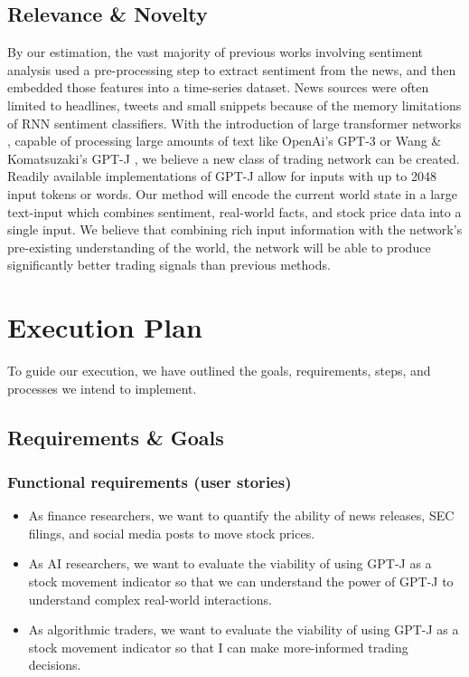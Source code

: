 \documentclass[conference]{IEEEtran}
\begin{document}
\subsection{Relevance \& Novelty}
By our estimation, the vast majority of previous works involving sentiment analysis used a pre-processing step to extract sentiment from the news, and then embedded those features into a time-series dataset. News sources were often limited to headlines, tweets and small snippets because of the memory limitations of RNN sentiment classifiers. With the introduction of large transformer networks \cite{Vaswani2017}, capable of processing large amounts of text like OpenAi's GPT-3 \cite{Brown2020} or Wang \& Komatsuzaki's GPT-J \cite{gpt-j}, we believe a new class of trading network can be created. Readily available implementations of GPT-J allow for inputs with up to 2048 input tokens or words. Our method will encode the current world state in a large text-input which combines sentiment, real-world facts, and stock price data into a single input. We believe that combining rich input information with the network's pre-existing understanding of the world, the network will be able to produce significantly better trading signals than previous methods.

\section{Execution Plan}
To guide our execution, we have outlined the goals, requirements, steps, and processes we intend to implement. 
\subsection{Requirements \& Goals}
\subsubsection{Functional requirements (user stories)}
\begin{itemize}
	\item As finance researchers, we want to quantify the ability of news releases, SEC filings, and social media posts to move stock prices.
	\item As AI researchers, we want to evaluate the viability of using GPT-J as a stock movement indicator so that we can understand the power of GPT-J to understand complex real-world interactions.
	\item As algorithmic traders, we want to evaluate the viability of using GPT-J as a stock movement indicator so that I can make more-informed trading decisions.
\end{itemize}
\end{document}

